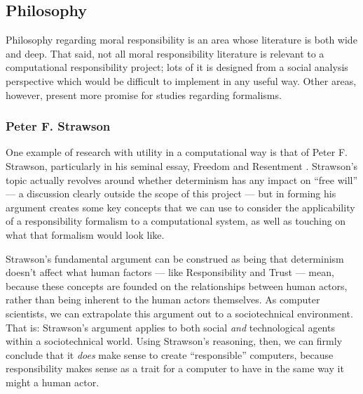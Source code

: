 

\subsection{Philosophy}\label{subsec:philosophy}
Philosophy regarding moral responsibility is an area whose literature is both wide and deep. That said, not all moral responsibility literature is relevant to a computational responsibility project; lots of it is designed from a social analysis perspective which would be difficult to implement in any useful way. Other areas, however, present more promise for studies regarding formalisms.\par

\subsubsection{Peter F. Strawson}\label{sec:strawson}
One example of research with utility in a computational way is that of Peter F. Strawson, particularly in his seminal essay, Freedom and Resentment \parencite{strawson}. Strawson's topic actually revolves around whether determinism has any impact on ``free will'' --- a discussion clearly outside the scope of this project --- but in forming his argument creates some key concepts that we can use to consider the applicability of a responsibility formalism to a computational system, as well as touching on what that formalism would look like.\par

Strawson's fundamental argument can be construed as being that determinism doesn't affect what human factors --- like Responsibility and Trust --- mean, because these concepts are founded on the relationships between human actors, rather than being inherent to the human actors themselves. As computer scientists, we can extrapolate this argument out to a sociotechnical environment. That is: Strawson's argument applies to both social \emph{and} technological agents within a sociotechnical world. Using Strawson's reasoning, then, we can firmly conclude that it \emph{does} make sense to create ``responsible'' computers, because responsibility makes sense as a trait for a computer to have in the same way it might a human actor.\par

